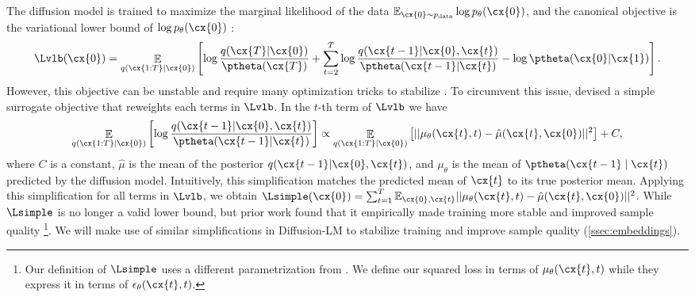 The diffusion model is trained to maximize the marginal likelihood of the data $\mathbb{E}_{\cx{0} \sim p_\text{data} }\log p_\theta(\cx{0})$, and the canonical objective is the variational lower bound of $\log p_\theta(\cx{0})$ \cite{pmlr-v37-sohl-dickstein15}:
\begin{equation}
\Lvlb (\cx{0}) = \mathop{\mathbb{E}}_{q(\cx{1:T} | \cx{0})} \left[\log \frac{q(\cx{T} | \cx{0})}{\ptheta(\cx{T})} + \sum_{t=2}^T \log \frac{q(\cx{t-1} | \cx{0},\cx{t})} {\ptheta(\cx{t-1} | \cx{t}) } - \log \ptheta( \cx{0} | \cx{1})\right].
\label{eqn:diffusion}
\end{equation}
However, this objective can be unstable and require many optimization tricks to stabilize \cite{nichol2021improved}. To circumvent this issue, \citet{ho2020denoising} devised a simple surrogate objective that reweights each terms in $\Lvlb$. In the $t$-th term of $\Lvlb$ we have 
\begin{equation}
\mathop{\mathbb{E}}_{q(\cx{1:T} | \cx{0})} \left[ \log \frac{q(\cx{t-1} | \cx{0},\cx{t})} {\ptheta(\cx{t-1} | \cx{t}) }\right] \propto \mathop{\mathbb{E}}_{q(\cx{1:T} | \cx{0})}  \left[ || \mu_\theta(\cx{t}, t) - \hat{\mu}(\cx{t}, \cx{0}) ||^2\right] + C, 
\label{eqn:simple}
\end{equation}
where $C$ is a constant, $\hat{\mu}$ is the mean of the posterior
 $q(\cx{t-1} | \cx{0},\cx{t})$, and $\mu_\theta$ is the mean of $\ptheta(\cx{t-1} \mid \cx{t})$ predicted by the diffusion model. Intuitively, this simplification matches the predicted mean of $\cx{t}$ to its true posterior mean. Applying this simplification for all terms in $\Lvlb$, we obtain $\Lsimple (\cx{0}) = \sum_{t=1}^T \mathbb{E}_{\cx{0}, \cx{t}} || \mu_\theta(\cx{t}, t) - \hat{\mu}(\cx{t}, \cx{0}) ||^2$.
While $\Lsimple$ is no longer a valid lower bound, but prior work found that it empirically made training more stable and improved sample quality \footnote{Our definition of $\Lsimple$ uses a different parametrization from \citet{ho2020denoising}. We define our squared loss in terms of $\mu_\theta(\cx{t}, t)$ while they express it in terms of $\epsilon_\theta(\cx{t}, t)$.}.
We will make use of similar simplifications in Diffusion-LM to stabilize training and improve sample quality (\cref{ssec:embeddings}).

